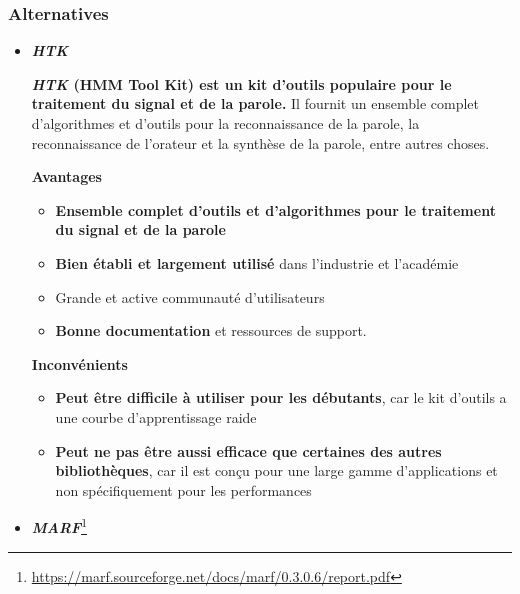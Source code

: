 \subsubsection*{Alternatives}

\begin{itemize}
    \item \large\textbf{\textit{HTK}} \normalsize

          \textbf{\textit{HTK} (HMM Tool Kit) est un kit d'outils populaire pour le traitement du signal et de la parole.} Il fournit un ensemble complet d'algorithmes et d'outils
          pour la reconnaissance de la parole, la reconnaissance de l'orateur et la synthèse de la parole, entre autres choses.

          \textbf{Avantages}
          \begin{itemize}
              \item \textbf{Ensemble complet d'outils et d'algorithmes pour le traitement du signal et de la parole}
              \item \textbf{Bien établi et largement utilisé} dans l'industrie et l'académie
              \item Grande et active communauté d'utilisateurs
              \item \textbf{Bonne documentation} et ressources de support.
          \end{itemize}


          \textbf{Inconvénients}
          \begin{itemize}
              \item \textbf{Peut être difficile à utiliser pour les débutants}, car le kit d'outils a une courbe d'apprentissage raide
              \item \textbf{Peut ne pas être aussi efficace que certaines des autres bibliothèques}, car il est conçu pour une large gamme
                    d'applications et non spécifiquement pour les performances
          \end{itemize}

    \item\large\textbf{\textit{MARF}}\normalsize\footnote{\url{https://marf.sourceforge.net/docs/marf/0.3.0.6/report.pdf}}



\end{itemize}
